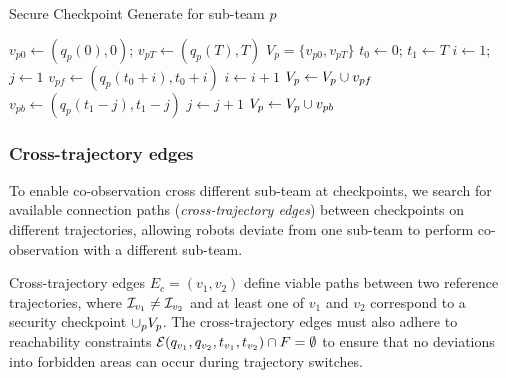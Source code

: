 \documentclass[10pt,twocolumn,twoside]{IEEEtran}
\begin{document}
\begin{algorithm}
  \caption{Secure Checkpoint Generate for sub-team $p$}\label{alg:checkpoint-gen}
  \begin{algorithmic}
  \State $v_{p0} \gets (q_{p}(0),0)$; $v_{pT} \gets (q_{p}(T),T)$
  \State $V_{p} = \{v_{p0}, v_{pT}\}$
  \State $t_0 \gets 0$; $t_1 \gets T$
    \State $i \gets 1$; $j\gets 1$
      \State $v_{pf} \gets (q_{p}(t_0+i),t_0+i)$
      \State $i \gets i+1$
    \EndWhile
    \State $V_{p}\gets V_{p}\cup v_{pf}$
    \State $v_{pb} \gets (q_{p}(t_1-j),t_1-j)$
    \State $j \gets j+1$
    \EndWhile
    \State $V_{p}\gets V_{p}\cup v_{pb}$
    \EndIf
  \EndWhile
  \end{algorithmic}
  \end{algorithm}


\subsubsection{Cross-trajectory edges}\label{sec:cross-traj-edges}
To enable co-observation cross different sub-team at checkpoints, we search for available connection paths (\emph{cross-trajectory edges}) between checkpoints on different trajectories, allowing robots deviate from one sub-team to perform co-observation with a different sub-team. 

Cross-trajectory edges $E_c = (v_1, v_2)$ define viable paths between two reference trajectories, where $\mathcal{I}_{v_1}\neq\mathcal{I}_{v_2}$ and at least one of $v_1 $ and $v_2$ correspond to a security checkpoint $\cup_p V_p$. The cross-trajectory edges must also adhere to reachability constraints $\mathcal{E}(q_{v_1}, q_{v_2}, t_{v_1},t_{v_2}) \cap F = \emptyset$ to ensure that no deviations into forbidden areas can occur during trajectory switches.  
\end{document}
